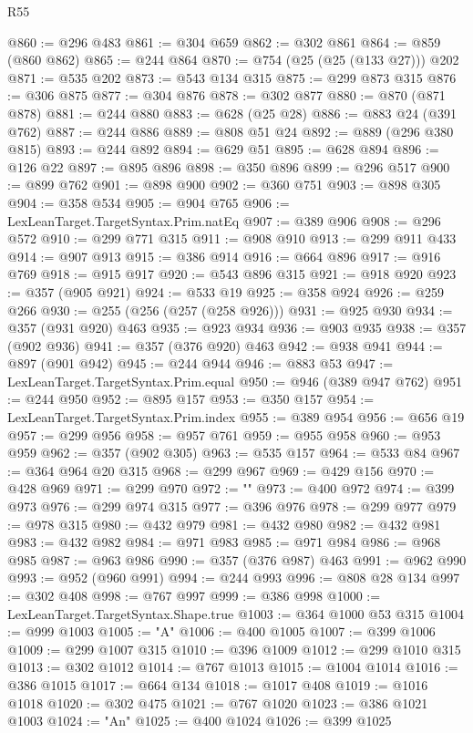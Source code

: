 \begin{lexlean}{R55}
\begin{coremodule}
@860 := @296 @483
@861 := @304 @659
@862 := @302 @861
@864 := @859 (@860 @862)
@865 := @244 @864
@870 := @754 (@25 (@25 (@133 @27))) @202
@871 := @535 @202
@873 := @543 @134 @315
@875 := @299 @873 @315
@876 := @306 @875
@877 := @304 @876
@878 := @302 @877
@880 := @870 (@871 @878)
@881 := @244 @880
@883 := @628 (@25 @28)
@886 := @883 @24 (@391 @762)
@887 := @244 @886
@889 := @808 @51 @24
@892 := @889 (@296 @380 @815)
@893 := @244 @892
@894 := @629 @51
@895 := @628 @894
@896 := @126 @22
@897 := @895 @896
@898 := @350 @896
@899 := @296 @517
@900 := @899 @762
@901 := @898 @900
@902 := @360 @751
@903 := @898 @305
@904 := @358 @534
@905 := @904 @765
@906 := LexLeanTarget.TargetSyntax.Prim.natEq
@907 := @389 @906
@908 := @296 @572
@910 := @299 @771 @315
@911 := @908 @910
@913 := @299 @911 @433
@914 := @907 @913
@915 := @386 @914
@916 := @664 @896
@917 := @916 @769
@918 := @915 @917
@920 := @543 @896 @315
@921 := @918 @920
@923 := @357 (@905 @921)
@924 := @533 @19
@925 := @358 @924
@926 := @259 @266
@930 := @255 (@256 (@257 (@258 @926)))
@931 := @925 @930
@934 := @357 (@931 @920) @463
@935 := @923 @934
@936 := @903 @935
@938 := @357 (@902 @936)
@941 := @357 (@376 @920) @463
@942 := @938 @941
@944 := @897 (@901 @942)
@945 := @244 @944
@946 := @883 @53
@947 := LexLeanTarget.TargetSyntax.Prim.equal
@950 := @946 (@389 @947 @762)
@951 := @244 @950
@952 := @895 @157
@953 := @350 @157
@954 := LexLeanTarget.TargetSyntax.Prim.index
@955 := @389 @954
@956 := @656 @19
@957 := @299 @956
@958 := @957 @761
@959 := @955 @958
@960 := @953 @959
@962 := @357 (@902 @305)
@963 := @535 @157
@964 := @533 @84
@967 := @364 @964 @20 @315
@968 := @299 @967
@969 := @429 @156
@970 := @428 @969
@971 := @299 @970
@972 := ""
@973 := @400 @972
@974 := @399 @973
@976 := @299 @974 @315
@977 := @396 @976
@978 := @299 @977
@979 := @978 @315
@980 := @432 @979
@981 := @432 @980
@982 := @432 @981
@983 := @432 @982
@984 := @971 @983
@985 := @971 @984
@986 := @968 @985
@987 := @963 @986
@990 := @357 (@376 @987) @463
@991 := @962 @990
@993 := @952 (@960 @991)
@994 := @244 @993
@996 := @808 @28 @134
@997 := @302 @408
@998 := @767 @997
@999 := @386 @998
@1000 := LexLeanTarget.TargetSyntax.Shape.true
@1003 := @364 @1000 @53 @315
@1004 := @999 @1003
@1005 := "A"
@1006 := @400 @1005
@1007 := @399 @1006
@1009 := @299 @1007 @315
@1010 := @396 @1009
@1012 := @299 @1010 @315
@1013 := @302 @1012
@1014 := @767 @1013
@1015 := @1004 @1014
@1016 := @386 @1015
@1017 := @664 @134
@1018 := @1017 @408
@1019 := @1016 @1018
@1020 := @302 @475
@1021 := @767 @1020
@1023 := @386 @1021 @1003
@1024 := "An"
@1025 := @400 @1024
@1026 := @399 @1025

\end{coremodule}
\end{lexlean}
